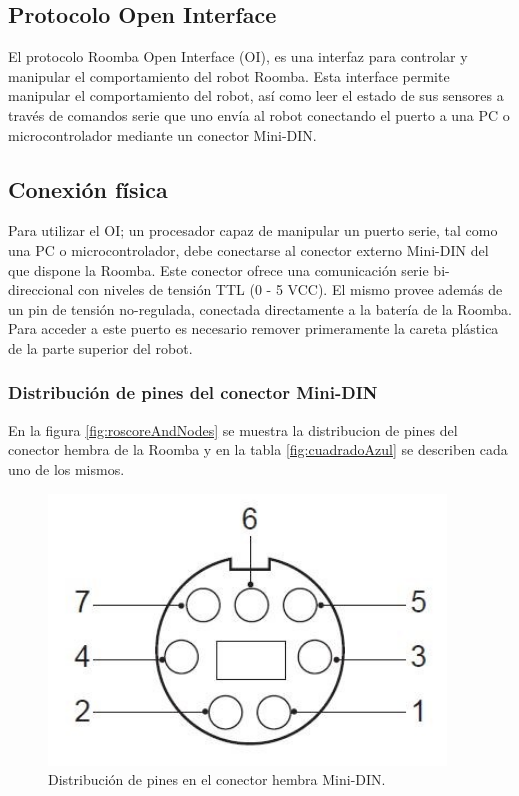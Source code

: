 
\subsection{Protocolo Open Interface}

El protocolo Roomba Open Interface (OI), es una interfaz para controlar y manipular el comportamiento del robot Roomba. Esta interface permite manipular el comportamiento del robot, así como leer el estado de sus sensores a través de comandos serie que uno envía al robot conectando el puerto a una PC o microcontrolador mediante un conector Mini-DIN.


\subsection{Conexión física}

Para utilizar el OI; un procesador capaz de manipular un puerto serie, tal como una PC o microcontrolador, debe conectarse al conector externo Mini-DIN del que dispone la Roomba. Este conector ofrece una comunicación serie bi-direccional con niveles de tensión TTL (0 - 5 VCC). El mismo provee además de un pin de tensión no-regulada, conectada directamente a la batería de la Roomba. Para acceder a este puerto es necesario remover primeramente la careta plástica de la parte superior del robot.

\subsubsection{Distribución de pines del conector Mini-DIN}

En la figura \ref{fig:roscoreAndNodes} se muestra la distribucion de pines del conector hembra de la Roomba y en la tabla \ref{fig:cuadradoAzul} se describen cada uno de los mismos.


\begin{figure}[ht]
    \centering
    \includegraphics[scale=.4]{./Figures/pinout.png}
    \caption{Distribución de pines en el conector hembra Mini-DIN.}
    \label{fig:roombaPinout}
\end{figure}


